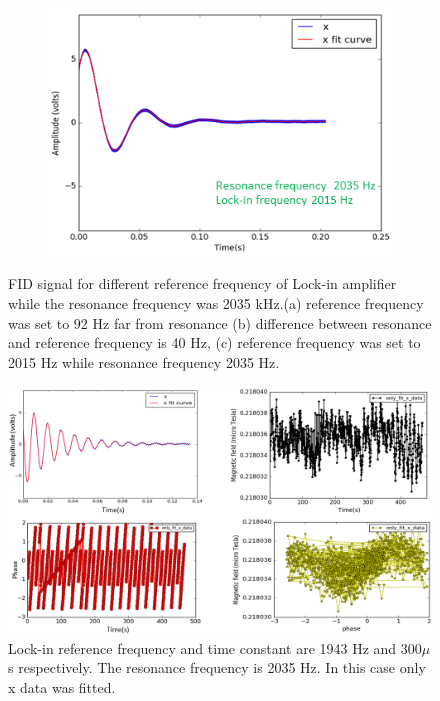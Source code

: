 \begin{figure}
\begin{subfigure}[b]{0.4\textwidth}
        \caption{}
        \label{fig: middle range}
    \end{subfigure}
    \begin{subfigure}[b]{0.4\textwidth}
        \centering
        \includegraphics[width=\textwidth]{figures/reference_frequency2}
        \caption{}
        \label{fig:close to resonance}
    \end{subfigure}
 \caption{FID signal for different reference frequency of Lock-in amplifier while the resonance frequency was 2035 kHz.(a) reference frequency was set to 92 Hz far from resonance (b) difference between resonance and reference frequency is 40 Hz, (c) reference frequency was set to 2015 Hz while resonance frequency 2035 Hz. \label{fig:different reference signal}}
\end{figure}

  \begin{figure}[h]
\centering\includegraphics[width=0.8\linewidth]{figures/freq_1943_single_fit_300microsec.png}
\caption{Lock-in reference frequency and time constant are 1943 Hz and 300$\mu$s respectively. The resonance frequency is 2035 Hz. In this case only x data was fitted. \label{fig:freq_1943_single_fit_300_micros}}
\end{figure}


